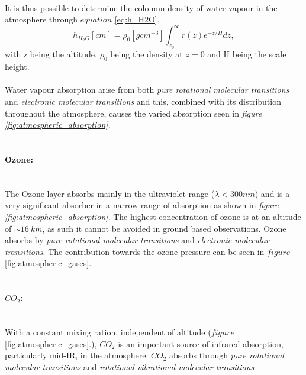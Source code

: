 \documentclass[a4paper, 12pt, twoside]{article}
\begin{document}
\\
It is thus possible to determine the coloumn density of water vapour in the atmosphere through $equation$ \ref{eq:h_H2O},
\begin{equation}
h_{H_{2}O} [cm] = \rho_{0} [gcm^{-3}]\int_{z_{0}}^{\infty}r(z)e^{-z/H}dz,
\label{eq:h_H2O}
\end{equation}
with z being the altitude, $\rho_{0}$ being the density at $z=0$ and H being the scale height.\\
\\
Water vapour absorption arise from both \emph{pure rotational molecular transitions} and \emph{electronic molecular transitions} and this, combined with its distribution throughout the atmosphere, causes the varied absorption seen in \emph{figure \ref{fig:atmospheric_absorption}}. \\
\\
\paragraph{Ozone:}\mbox{} \\
The Ozone layer absorbs mainly in the ultraviolet range ($\lambda < 300 nm$) and is a very significant absorber in a narrow range of absorption as shown in \emph{figure \ref{fig:atmospheric_absorption}}. The highest concentration of ozone is at an altitude of $\sim16\ km$, as such it cannot be avoided in ground based observations. Ozone absorbs by \emph{pure rotational molecular transitions} and \emph{electronic molecular transitions}. The contribution towards the ozone pressure can be seen in $figure$ \ref{fig:atmospheric_gases}. \\
\\
\paragraph{$CO_{2}$:}\mbox{} \\  
With a constant mixing ration, independent of altitude ($figure$ \ref{fig:atmospheric_gases}.), $CO_{2}$ is an important source of infrared absorption, particularly mid-IR, in the atmosphere. $CO_{2}$ absorbs through \emph{pure rotational molecular transitions} and \emph{rotational-vibrational molecular transitions}
\end{document}
